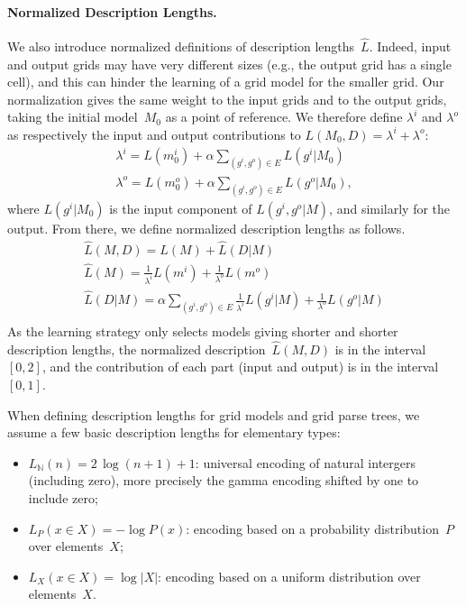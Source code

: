 \documentclass[a4paper]{llncs}
\newcommand{\nat}{\mathbb{N}}
\begin{document}
\paragraph{Normalized Description Lengths.}
We also introduce normalized definitions of description
lengths~$\hat{L}$. Indeed, input and output grids may have very
different sizes (e.g., the output grid has a single cell), and this
can hinder the learning of a grid model for the smaller grid. Our
normalization gives the same weight to the input grids and to the
output grids, taking the initial model~$M_0$ as a point of reference.
We therefore define $\lambda^i$ and $\lambda^o$ as respectively the
input and output contributions to $L(M_0,D) = \lambda^i + \lambda^o$:
\begin{align*}
    \lambda^i = L(m^i_0) + \alpha \sum_{(g^i,g^o) \in E} L(g^i|M_0) \\
    \lambda^o = L(m^o_0) + \alpha \sum_{(g^i,g^o) \in E} L(g^o|M_0),
\end{align*}
where $L(g^i|M_0)$ is the input component of $L(g^i,g^o|M)$, and
similarly for the output.  From there, we define normalized
description lengths as follows.
\begin{align*}
  \hat{L}(M,D) = \hat{L}(M) + \hat{L}(D|M) \\
  \hat{L}(M) = \frac{1}{\lambda^i}L(m^i) + \frac{1}{\lambda^o}L(m^o) \\
  \hat{L}(D|M) = \alpha \sum_{(g^i,g^o) \in E} \frac{1}{\lambda^i}L(g^i|M) + \frac{1}{\lambda^o}L(g^o|M) \\
\end{align*}
As the learning strategy only selects models giving shorter and shorter description lengths, the normalized description~$\hat{L}(M,D)$ is in the interval~$[0,2]$, and the contribution of each part (input and output) is in the interval~$[0,1]$.

When defining description lengths for grid models and grid parse
trees, we assume a few basic description lengths for elementary types:
\begin{itemize}
\item $L_\nat(n) = 2\,\log (n+1) + 1$: universal encoding of natural
  intergers (including zero), more precisely the gamma encoding
  shifted by one to include zero;
\item $L_P(x \in X) = -\log P(x)$: encoding based on a probability distribution~$P$ over elements~$X$;
\item $L_X(x \in X) = \log |X|$: encoding based on a uniform distribution over elements~$X$.
\end{itemize}
\end{document}
